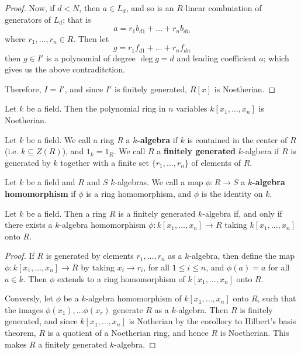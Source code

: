 \begin{proof}
     Now, if $d<N$, then  $a \in L_d$, and so is an  $R$-linear combniation of
     generators of  $L_d$; that is
     \begin{equation*}
         a=r_1b_{d1}+\dots+r_nb_{dn}
     \end{equation*}
     where $r_1, \dots, r_n \in R$. Then let
     \begin{equation*}
         g=r_1f_{d1}+\dots+r_nf_{dn}
     \end{equation*}
     then $g \in I'$ is a polynomial of degree  $\deg{g}=d$ and leading
     coefficient $a$; which gives us the above contraditction.

     Therefore, $I=I'$, and since $I'$ is finitely generated,  $R[x]$ is
     Noetherian.
 \end{proof}
 \begin{corollary}
     Let $k$ be a field. Then the polynomial ring in  $n$ variables  $k[x_1,
     \dots, x_n]$ is Noetherian.
 \end{corollary}

 \begin{definition}
     Let $k$ be a field. We call a ring  $R$ a  \textbf{$k$-algebra} if $k$ is
     contained in the center of  $R$  (i.e. $k \subseteq Z(R)$), and $1_k=1_R$.
     We call  $R$ a  \textbf{finitely generated} $k$-algbera if $R$ is generated
     by  $k$ together with a finite set $\{r_1, \dots, r_n\}$ of elements of
     $R$.
 \end{definition}

 \begin{definition}
     Let $k$ be a field and $R$ and  $S$  $k$-algebras. We call a map  $\phi:R
     \xrightarrow{} S$ a \textbf{$k$-algebra homomorphism} if $\phi$ is a ring
     homomorphism, and  $\phi$ is the identity on $k$.
 \end{definition}

 \begin{lemma}\label{1.1.4}
     Let $k$ be a field. Then a ring $R$ is a finitely generated $k$-algebra if,
     and only if there exists a $k$-algebra homomorphism $\phi:k[x_1, \dots,
     x_n] \xrightarrow{} R$ taking $k[x_1, \dots, x_n]$ onto $R$.
 \end{lemma}
 \begin{proof}
     If $R$ is generated by elements  $r_1, \dots, r_n$ as a $k$-algebra, then
     define the map $\phi:k[x_1, \dots, x_n] \xrightarrow{} R$ by taking $x_i
     \xrightarrow{} r_i$, for all $1 \leq i \leq n$, and  $\phi(a)=a$ for all $a
     \in k$. Then  $\phi$ extends to a ring homomorphism of  $k[x_1, \dots,
     x_n]$ onto $R$.

     Conversly, let  $\phi$ be a $k$-algebra homomorphism of $k[x_1, \dots,
     x_n]$ onto $R$,  such that the images $\phi(x_1), \dots \phi(x_r)$ generate
     $R$ as a  $k$-algebra. Then $R$ is finitely generated, and since  $k[x_1,
     \dots, x_n]$ is Notherian by the corollory to Hilbert's basis theorem, $R$
     is a quotient of a Noetherian ring, and hence  $R$ is Noetherian. This
     makes  $R$ a finitely generated  $k$-algebra.
 \end{proof}

